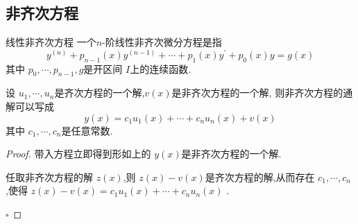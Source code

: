 \documentclass[lang=cn,12pt,color=green,fontset=none]{elegantbook}
\begin{document}
\subsection{非齐次方程}

\begin{definition}{线性非齐次方程}
    一个\(  n  \)-阶线性非齐次微分方程是指
    \begin{equation}
        y^{\left( n \right) }+ p_{n-1}\left( x \right)y^{\left( n-1 \right) }+ \cdots + p_1\left( x \right)y^{\prime} + p_0\left( x \right)y=g\left( x \right)    
    \end{equation} 
    其中 \(   p_0,\cdots,p_{n-1} ,g  \)是开区间 \(  I  \)上的连续函数.  
\end{definition}

\begin{proposition}
    设 \(   u_1,\cdots,u_n   \)是齐次方程的一个解,\(  v\left( x \right)   \)是非齐次方程的一个解, 则非齐次方程的通解可以写成 \[
    y\left( x \right)=c_1u_1\left( x \right)+ \cdots + c_{n}u_{n}\left( x \right)+ v\left( x \right)    
    \] 其中 \(   c_1,\cdots,c_n   \)是任意常数. 
\end{proposition}

\begin{proof}
    带入方程立即得到形如上的 \(  y\left( x \right)   \)是非齐次方程的一个解.
    
    任取非齐次方程的解 \(  z\left( x \right)   \),则 \(  z\left( x \right)-v\left( x \right)    \)是齐次方程的解,从而存在 \(   c_1,\cdots,c_n   \)   ,使得 \(  z\left( x \right)-v\left( x \right)=c_1u_1\left( x \right)+ \cdots + c_{n}u_{n}\left( x \right)      \) .

    \hfill $\square$
\end{proof}
\end{document}
